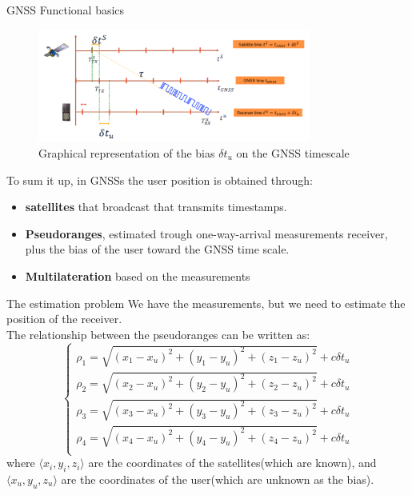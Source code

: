 \begin{section}{GNSS Functional basics}
    \begin{figure}[h]
      \centering
      \includegraphics[width=0.8\textwidth]{img/wireless/GNSS bias.png}
      \caption{Graphical representation of the bias $\delta t_u$ on the GNSS timescale}
      \label{fig:GNSS pseudorange}
    \end{figure}

    To sum it up, in GNSSs the user position is obtained through:
    \begin{itemize}
      \item \textbf{satellites} that broadcast that transmits timestamps.
      \item \textbf{Pseudoranges}, estimated trough one-way-arrival measurements
        receiver, plus the bias of the user toward the GNSS time scale.
      \item \textbf{Multilateration} based on the measurements
    \end{itemize}

    \begin{subsection}{The estimation problem}
      We have the measurements, but we need to estimate the position of the receiver.\\
      The relationship between the pseudoranges can be written as:
      \begin{equation}
        \begin{cases}
          \rho_1 = \sqrt{(x_1 - x_u)^2 + (y_1 - y_u)^2 + (z_1 - z_u)^2} + c\delta t_u\\
          \rho_2 = \sqrt{(x_2 - x_u)^2 + (y_2 - y_u)^2 + (z_2 - z_u)^2} + c\delta t_u\\
          \rho_3 = \sqrt{(x_3 - x_u)^2 + (y_3 - y_u)^2 + (z_3 - z_u)^2} + c\delta t_u\\
          \rho_4 = \sqrt{(x_4 - x_u)^2 + (y_4 - y_u)^2 + (z_4 - z_u)^2} + c\delta t_u\\
        \end{cases}
        \label{eq:GNSS pseudorange relationship}
      \end{equation}
      where $\langle x_i, y_i, z_i \rangle$ are the coordinates of the satellites(which are known),
      and $\langle x_u, y_u, z_u \rangle$ are the coordinates of the user(which are unknown as the bias).


\end{subsection}
\end{section}

